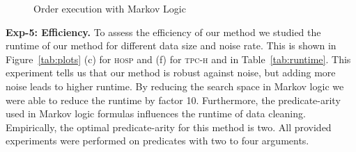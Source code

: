 
\begin{figure}
\centering
{}
\caption{Order execution with Markov Logic} 
\label{fig:orderexec}
\end{figure}



\textbf{Exp-5: Efficiency.} To assess the efficiency of our method we studied the runtime of our method for different data size and noise rate. This is shown in Figure~\ref{tab:plots} (c) for \textsc{hosp} and (f) for \textsc{tpc-h} and in Table~\ref{tab:runtime}. This experiment tells us that our method is robust against noise, but adding more noise leads to higher runtime. By reducing the search space in Markov logic we were able to reduce the runtime by factor 10. Furthermore, the predicate-arity used in Markov logic formulas influences the runtime of data cleaning. Empirically, the optimal predicate-arity for this method is two. All provided experiments were performed on predicates with two to four arguments. 

